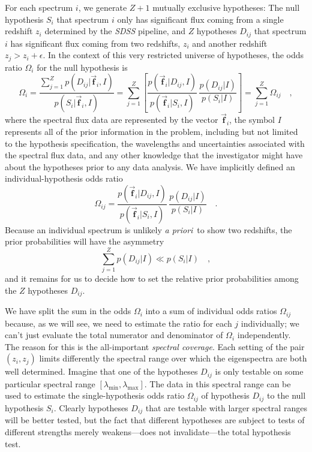 \documentclass[12pt]{article}
\newcommand{\facility}[1]{\textsl{#1}}
\newcommand{\foreign}[1]{\textsl{#1}}
\newcommand{\apriori}{\foreign{a priori}}
\newcommand{\hoggvector}[1]{\boldsymbol{\vec{#1}}}
\newcommand{\fvec}{\hoggvector{f}}
\begin{document}
For each spectrum $i$, we generate $Z+1$ mutually exclusive hypotheses:
The null hypothesis $S_i$ that spectrum $i$ only has significant flux
coming from a single redshift $z_i$ determined by the \facility{SDSS}
pipeline, and $Z$ hypotheses $D_{ij}$ that spectrum $i$ has significant
flux coming from two redshifts, $z_i$ and another redshift
$z_j>z_i+\epsilon$.  In the context of this very restricted universe
of hypotheses, the odds ratio $\Omega_i$ for the null hypothesis is
\begin{equation}\label{eq:odds}
\Omega_i = \frac{\sum_{j=1}^Z p(D_{ij}|\fvec_i,I)}{p(S_i|\fvec_i,I)}
 = \sum_{j=1}^Z \left[\frac{p(\fvec_i|D_{ij},I)}{p(\fvec_i|S_i,I)}
 \,\frac{p(D_{ij}|I)}{p(S_i|I)}\right] = \sum_{j=1}^Z\Omega_{ij}\quad,
\end{equation}
where the spectral flux data are represented by the vector
$\fvec_i$, the symbol $I$ represents all of the prior information
in the problem, including but not limited to the hypothesis
specification, the wavelengths and uncertainties associated with the
spectral flux data, and any other knowledge that the investigator
might have about the hypotheses prior to any data analysis.  We have
implicitly defined an individual-hypothesis odds ratio
\begin{equation}
\Omega_{ij} = \frac{p(\fvec_i|D_{ij},I)}{p(\fvec_i|S_i,I)}
  \,\frac{p(D_{ij}|I)}{p(S_i|I)}\quad.
\end{equation}
Because an individual spectrum is unlikely \apriori\ to show two
redshifts, the prior probabilities will have the asymmetry
\begin{equation}
\sum_{j=1}^Z p(D_{ij}|I) \ll p(S_i|I) \quad,
\end{equation}
and it remains for us to decide how to set the relative prior
probabilities among the $Z$ hypotheses $D_{ij}$.

We have split the sum in the odds $\Omega_i$ into a sum of individual
odds ratios $\Omega_{ij}$ because, as we will see, we need to estimate
the ratio for each $j$ individually; we can't just evaluate the total
numerator and denominator of $\Omega_i$ independently.  The reason for
this is the all-important \emph{spectral coverage}.  Each setting of
the pair $(z_i,z_j)$ limits differently the spectral range over which
the eigenspectra are both well determined.  Imagine that one of the
hypotheses $D_{ij}$ is only testable on some particular spectral range
$[\lambda_{\min},\lambda_{\max}]$.  The data in this spectral range
can be used to estimate the single-hypothesis odds ratio $\Omega_{ij}$
of hypothesis $D_{ij}$ to the null hypothesis $S_i$.  Clearly
hypotheses $D_{ij}$ that are testable with larger spectral ranges will
be better tested, but the fact that different hypotheses are subject
to tests of different strengths merely weakens---does not
invalidate---the total hypothesis test.
\end{document}
